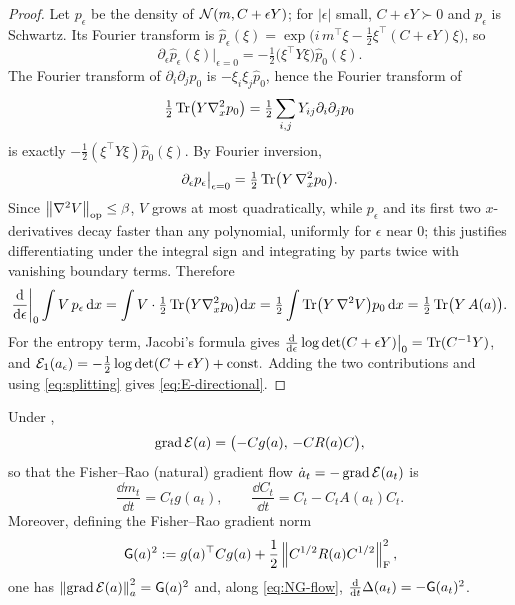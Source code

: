 \begin{proof}
Let $p_\epsilon$ be the density of $\mathcal{N}(m,C+\epsilon Y)$; for $|\epsilon|$ small,
$C+\epsilon Y\succ0$ and $p_\epsilon$ is Schwartz. Its Fourier transform is
$\widehat p_\epsilon(\xi)=\exp\bigl(i\,m^\top\xi-\tfrac12\xi^\top(C+\epsilon Y)\xi\bigr)$, so
\[
    \partial_\epsilon\widehat p_\epsilon(\xi)\big|_{\epsilon=0}
    =-\tfrac12\bigl(\xi^\top Y\xi\bigr)\widehat p_0(\xi).
\]
The Fourier transform of $\partial_i\partial_jp_0$ is $-\xi_i\xi_j\widehat p_0$, hence the Fourier
transform of
\[
    \tfrac12\operatorname{Tr}\bigl(Y\nabla_x^2p_0\bigr)=\tfrac12\sum_{i,j}Y_{ij}\partial_i\partial_jp_0
\]
is exactly $-\tfrac12(\xi^\top Y\xi)\widehat p_0(\xi)$. By Fourier inversion,
\begin{equation}
\label{eq:heat-identity}
    \partial_\epsilon p_\epsilon\big|_{\epsilon=0}=\tfrac12\operatorname{Tr}\bigl(Y\,\nabla_x^2p_0\bigr).
\end{equation}
Since $\left\lVert \nabla^2V\right\rVert_{\mathrm{op}}\leq\beta$, $V$ grows at most quadratically, while $p_\epsilon$ and its
first two $x$-derivatives decay faster than any polynomial, uniformly for $\epsilon$ near $0$;
this justifies differentiating under the integral sign and integrating by parts twice with
vanishing boundary terms. Therefore
\[
    \frac{\mathrm{d}}{\mathrm{d}\epsilon}\bigg|_{0}\int V\,p_\epsilon\,\mathrm{d} x
    =\int V\cdot\tfrac12\operatorname{Tr}\bigl(Y\nabla_x^2p_0\bigr)\mathrm{d} x
    =\tfrac12\int\operatorname{Tr}\bigl(Y\,\nabla^2V\bigr)p_0\,\mathrm{d} x
    =\tfrac12\operatorname{Tr}\bigl(Y\,A(a)\bigr).
\]
For the entropy term, Jacobi's formula gives
$\tfrac{\mathrm{d}}{\mathrm{d}\epsilon}\log\det(C+\epsilon Y)\big|_0=\operatorname{Tr}(C^{-1}Y)$, and
$\mathcal{E}_1(a_\epsilon)=-\tfrac12\log\det(C+\epsilon Y)+\text{const.}$ Adding the two contributions
and using \eqref{eq:splitting} gives \eqref{eq:E-directional}.
\end{proof}

\begin{lemma}
\label{lem:FR-gradient}
Under ,
\begin{equation}
\label{eq:FR-grad}
    \operatorname{grad}\mathcal{E}(a)=\bigl(-Cg(a),\,-CR(a)C\bigr),
\end{equation}
so that the Fisher--Rao (natural) gradient flow $\dot a_t=-\operatorname{grad}\mathcal{E}(a_t)$ is
\begin{equation}
\label{eq:NG-flow}
    \frac{\dd m_t}{\dd t}=C_tg(a_t),
    \qquad
    \frac{\dd C_t}{\dd t}=C_t-C_tA(a_t)C_t .
\end{equation}
Moreover, defining the Fisher--Rao gradient norm
\begin{equation}
\label{eq:G-norm}
    \mathsf{G}(a)^2:=g(a)^\top Cg(a)+\frac12\left\lVert C^{1/2}R(a)C^{1/2}\right\rVert_{\mathrm{F}}^2 ,
\end{equation}
one has $\left\lVert \operatorname{grad}\mathcal{E}(a)\right\rVert_a^2=\mathsf{G}(a)^2$ and, along \eqref{eq:NG-flow},
$\tfrac{\mathrm{d}}{\mathrm{d} t}\Delta(a_t)=-\mathsf{G}(a_t)^2$.
\end{lemma}

